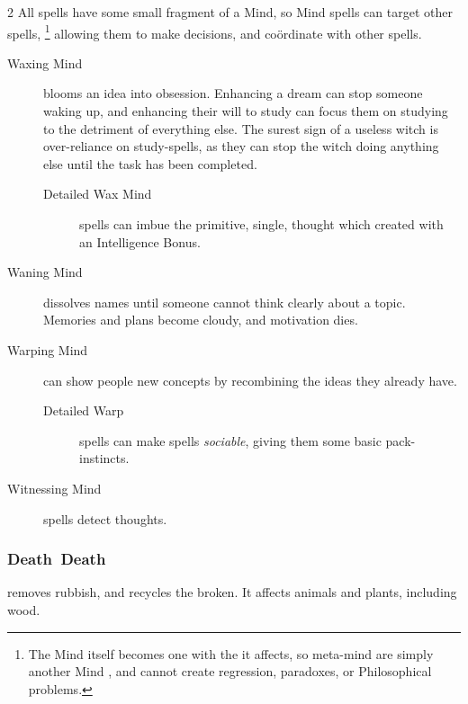 \begin{multicols}{2}
All \glspl{spell} have some small fragment of a Mind, so Mind \glspl{spell} can target other \glspl{spell},%
\footnote{The Mind  itself becomes one with the  it affects, so meta-mind  are simply another Mind , and cannot create regression, paradoxes, or Philosophical problems.}
allowing them to make decisions, and co\"ordinate with other \glspl{spell}.


\begin{description}
  \item[Waxing Mind]
  blooms an idea into obsession.
  Enhancing a dream can stop someone waking up, and enhancing their will to study can focus them on studying to the detriment of everything else.
  The surest sign of a useless \gls{witch} is over-reliance on study-\glspl{spell}, as they can stop the \gls{witch} doing anything else until the task has been completed.

  \begin{description}
    \item[Detailed Wax Mind]
    \glspl{spell} can imbue the primitive, single, thought which created  with an Intelligence Bonus.
  \end{description}

  \item[Waning Mind]
  dissolves names until someone cannot think clearly about a topic.
  Memories and plans become cloudy, and motivation dies.

  \item[Warping Mind]
  can show people new concepts by recombining the ideas they already have.

  \begin{description}
    \item[Detailed Warp]
    \glspl{spell} can make \glspl{spell} \emph{sociable}, giving them some basic pack-instincts.
  \end{description}

  \item[Witnessing Mind]
  \glspl{spell} detect thoughts.
\end{description}

\subsubsection[Death]{\gls{Death}~Death}
removes rubbish, and recycles the broken.
It affects animals and plants, including wood.


\end{multicols}
